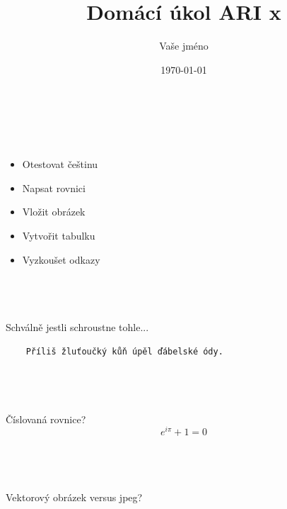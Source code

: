\documentclass[twoside]{article}
\title{Domácí úkol ARI x}
\author{Vaše jméno}
\date{\today}
\begin{document}
\maketitle

\section{~}
\label{sec:ukol1}

\begin{itemize}
\item Otestovat češtinu
\item Napsat rovnici
\item Vložit obrázek
\item Vytvořit tabulku
\item Vyzkoušet odkazy
\end{itemize}

\subsection{~}
\label{sec:Cz}
Schválně jestli schroustne tohle...
\begin{verbatim}
	Příliš žluťoučký kůň úpěl ďábelské ódy.
\end{verbatim}

\subsection{~}
Číslovaná rovnice?
\label{sec:Eq}
\begin{equation}
e^{i \pi} + 1 = 0
\label{eq:TheMostFamousFormula}
\end{equation}

\subsection{~}
\label{sec:Img}
Vektorový obrázek versus jpeg?
\end{document}
